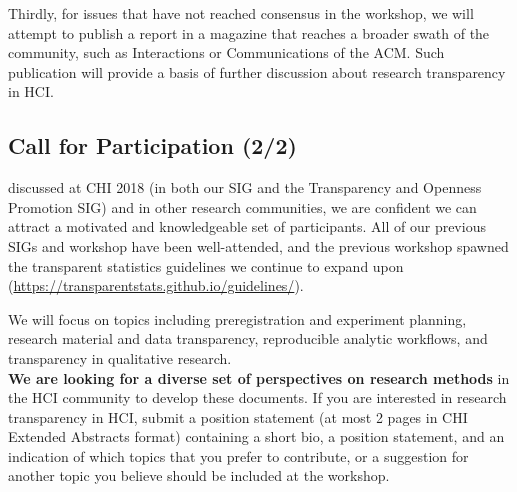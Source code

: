 \documentclass[sigchi-a, authorversion]{acmart}
\begin{document}
Thirdly, for issues that have not reached consensus in the workshop, we will attempt to publish a report in a magazine that reaches a broader swath of the community, such as Interactions or Communications of the ACM. Such publication will provide a basis of further discussion about research transparency in HCI.

\begin{sidebar}
\vspace{-10cm}

\section{Call for Participation (2/2)}

discussed at CHI 2018 (in both our SIG and the Transparency and Openness Promotion SIG) and in other research communities, we are confident we can attract a motivated and knowledgeable set of participants. All of our previous SIGs and workshop have been well-attended, and the previous workshop spawned the transparent statistics guidelines we continue to expand upon (\url{https://transparentstats.github.io/guidelines/}).


We will focus on topics including preregistration and experiment planning, research material and data transparency, reproducible analytic workflows, and transparency in qualitative research. \\

\textbf{We are looking for a diverse set of perspectives on research methods} in the HCI community to develop these documents. If you are interested in research transparency in HCI, submit a position statement (at most 2 pages in CHI Extended Abstracts format) containing a short bio, a position statement, and an indication of which topics that you prefer to contribute, or a suggestion for another topic you believe should be included at the workshop.

\end{sidebar}







\end{document}
